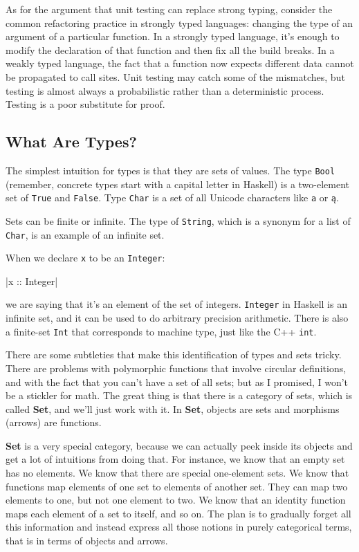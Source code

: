 As for the argument that unit testing can replace strong typing,
consider the common refactoring practice in strongly typed languages:
changing the type of an argument of a particular function. In a strongly
typed language, it's enough to modify the declaration of that function
and then fix all the build breaks. In a weakly typed language, the fact
that a function now expects different data cannot be propagated to call
sites. Unit testing may catch some of the mismatches, but testing is
almost always a probabilistic rather than a deterministic process.
Testing is a poor substitute for proof.

\subsection{What Are Types?}\label{what-are-types}

The simplest intuition for types is that they are sets of values. The
type \texttt{Bool} (remember, concrete types start with a capital letter
in Haskell) is a two-element set of \texttt{True} and \texttt{False}.
Type \texttt{Char} is a set of all Unicode characters like
\texttt{a} or \texttt{ą}.

Sets can be finite or infinite. The type of \texttt{String}, which is a
synonym for a list of \texttt{Char}, is an example of an infinite set.

When we declare \texttt{x} to be an \texttt{Integer}:

|x :: Integer|

we are saying that it's an element of the set of integers.
\texttt{Integer} in Haskell is an infinite set, and it can be used to do
arbitrary precision arithmetic. There is also a finite-set \texttt{Int}
that corresponds to machine type, just like the C++ \texttt{int}.

There are some subtleties that make this identification of types and
sets tricky. There are problems with polymorphic functions that involve
circular definitions, and with the fact that you can't have a set of all
sets; but as I promised, I won't be a stickler for math. The great thing
is that there is a category of sets, which is called \textbf{Set}, and
we'll just work with it. In \textbf{Set}, objects are sets and morphisms
(arrows) are functions.

\textbf{Set} is a very special category, because we can actually peek
inside its objects and get a lot of intuitions from doing that. For
instance, we know that an empty set has no elements. We know that there
are special one-element sets. We know that functions map elements of one
set to elements of another set. They can map two elements to one, but
not one element to two. We know that an identity function maps each
element of a set to itself, and so on. The plan is to gradually forget
all this information and instead express all those notions in purely
categorical terms, that is in terms of objects and arrows.

